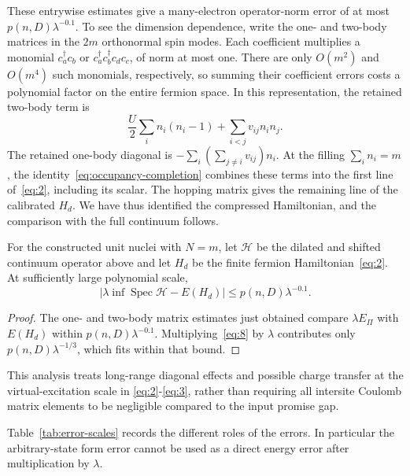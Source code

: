 These entrywise estimates give a many-electron operator-norm error of
at most $p(n,D)\lambda^{-0.1}$. To see the dimension dependence,
write the one- and two-body matrices in the $2m$ orthonormal spin modes.
Each coefficient multiplies a monomial $c_a^\dagger c_b$ or
$c_a^\dagger c_b^\dagger c_d c_c$, of norm at most one. There are
only $O(m^2)$ and $O(m^4)$ such monomials, respectively, so summing their
coefficient errors costs a polynomial factor on the entire fermion
space. In this representation, the retained two-body term is
\[
       \frac{U}{2}\sum_i n_i(n_i-1)+\sum_{i<j}v_{ij} n_i n_j .
\]
The retained one-body diagonal is
$-\sum_i(\sum_{j\ne i}v_{ij})n_i$. At the filling
$\sum_i n_i=m$, the identity~\eqref{eq:occupancy-completion} combines
these terms into the first line of~\eqref{eq:2}, including its scalar.
The hopping matrix gives the remaining line of the calibrated $H_d$.
We have thus identified the compressed Hamiltonian, and the comparison
with the full continuum follows.

\begin{proposition}\label{prop:energy-comparison}
For the constructed unit nuclei with $N=m$, let $\mathcal H$ be the
dilated and shifted continuum operator above and let $H_d$ be the
finite fermion Hamiltonian~\eqref{eq:2}. At sufficiently large polynomial
scale,
\[
          |\lambda\inf\operatorname{Spec}\mathcal H-E(H_d)|
                              \le p(n,D)\lambda^{-0.1}.             \tag{9}\label{eq:9}
\]
\end{proposition}

\begin{proof}
The one- and two-body matrix estimates just obtained compare
$\lambda E_\Pi$ with $E(H_d)$ within $p(n,D)\lambda^{-0.1}$.
Multiplying~\eqref{eq:8} by $\lambda$ contributes only
$p(n,D)\lambda^{-1/3}$, which fits within that bound.
\end{proof}
This analysis treats long-range diagonal effects and possible charge transfer at the virtual-excitation scale in \eqref{eq:2}-\eqref{eq:3}, rather than requiring all intersite Coulomb matrix elements to be negligible compared to the input promise gap.

Table~\ref{tab:error-scales} records the different roles of the errors.
In particular the arbitrary-state form error cannot be used as a direct
energy error after multiplication by $\lambda$.

